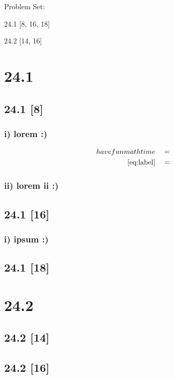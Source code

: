 \documentclass{article}
\begin{document}
{\large \noindent Problem Set:}

\par 24.1 [8, 16, 18]
\par 24.2 [14, 16]
\vspace{5mm}

\noindent \hrulefill

\section*{24.1}
\setcounter{equation}{0}

\subsection*{24.1 [8]}

\subsubsection*{i) lorem :)}

\begin{align}
    \label{eq:label}
    have fun math time && &=
    \\
    \label{eq:label2}
    \eqref{eq:label} && &=
\end{align}
\subsubsection*{ii) lorem ii :)}

\subsection*{24.1 [16]}

\subsubsection*{i) ipsum :)}

\subsection*{24.1 [18]}

\newpage

\section*{24.2}
\setcounter{equation}{0}

\subsection*{24.2 [14]}
\subsection*{24.2 [16]}
\end{document}
